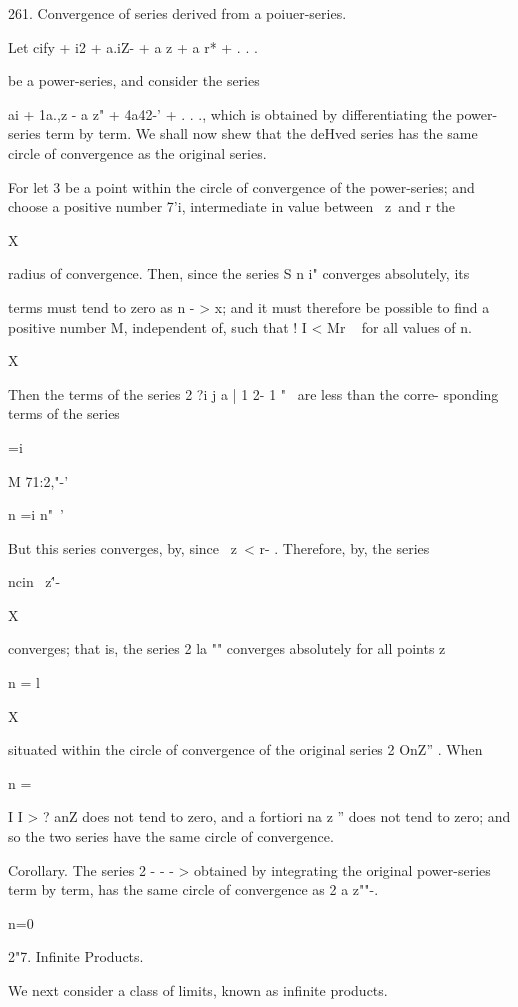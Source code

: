 261. Convergence of series derived from a poiuer-series.

Let cify + i2 + a.iZ- + a z + a r* + . . .

be a power-series, and consider the series

ai + 1a.,z - a z" + 4a42-' + . . ., which is obtained by
differentiating the power-series term by term. We shall now shew that
the deHved series has the same circle of convergence as the original
series.

For let 3 be a point within the circle of convergence of the
power-series; and choose a positive number 7'i, intermediate in value
between \ z\ and r the

X

radius of convergence. Then, since the series S n i" converges
absolutely, its

terms must tend to zero as n - > x; and it must therefore be possible
to find a positive number M, independent of, such that ! I < Mr ~ for
all values of n.

 X

Then the terms of the series 2 ?i j a | 1 2- 1 "~ are less than the
corre- sponding terms of the series

 =i

M 71:2,"-'

n =i n"~'

But this series converges, by, since \ z\ < r- . Therefore, by, the series

 ncin \ z\''-

X

converges; that is, the series 2 la "" converges absolutely for all
points z

n = l

X

situated within the circle of convergence of the original series 2
OnZ'' . When

n =

I I > ? anZ does not tend to zero, and a fortiori na z '' does not
tend to zero; and so the two series have the same circle of
convergence.

%
%

Corollary. The series 2 - - - > obtained by integrating the original
power-series term by term, has the same circle of convergence as 2 a
z""-.

n=0

2"7. Infinite Products.

We next consider a class of limits, known as infinite products.

